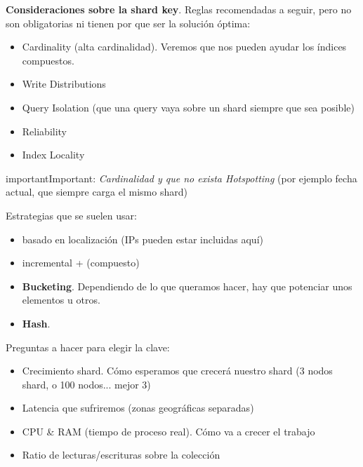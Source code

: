 \documentclass[a4paper,10pt,english]{sphinxmanual}
\begin{document}
\textbf{Consideraciones sobre la shard key}. Reglas recomendadas a seguir, pero no son obligatorias ni tienen por que ser la solución óptima:
\begin{itemize}
\item {} 
Cardinality (alta cardinalidad). Veremos que nos pueden ayudar los índices compuestos.

\item {} 
Write Distributions

\item {} 
Query Isolation (que una query vaya sobre un shard siempre que sea posible)

\item {} 
Reliability

\item {} 
Index Locality

\end{itemize}

\begin{notice}{important}{Important:}
\emph{Cardinalidad y que no exista Hotspotting} (por ejemplo fecha actual, que siempre carga el mismo shard)
\end{notice}

Estrategias que se suelen usar:
\begin{itemize}
\item {} 
basado en localización (IPs pueden estar incluidas aquí)

\item {} 
incremental + (compuesto)

\item {} 
\textbf{Bucketing}. Dependiendo de lo que queramos hacer, hay que potenciar unos elementos u otros.

\item {} 
\textbf{Hash}.

\end{itemize}

Preguntas a hacer para elegir la clave:
\begin{itemize}
\item {} 
Crecimiento shard. Cómo esperamos que crecerá nuestro shard (3 nodos shard, o 100 nodos... mejor 3)

\item {} 
Latencia que sufriremos (zonas geográficas separadas)

\item {} 
CPU \& RAM (tiempo de proceso real). Cómo va a crecer el trabajo

\item {} 
Ratio de lecturas/escrituras sobre la colección

\end{itemize}
\end{document}

